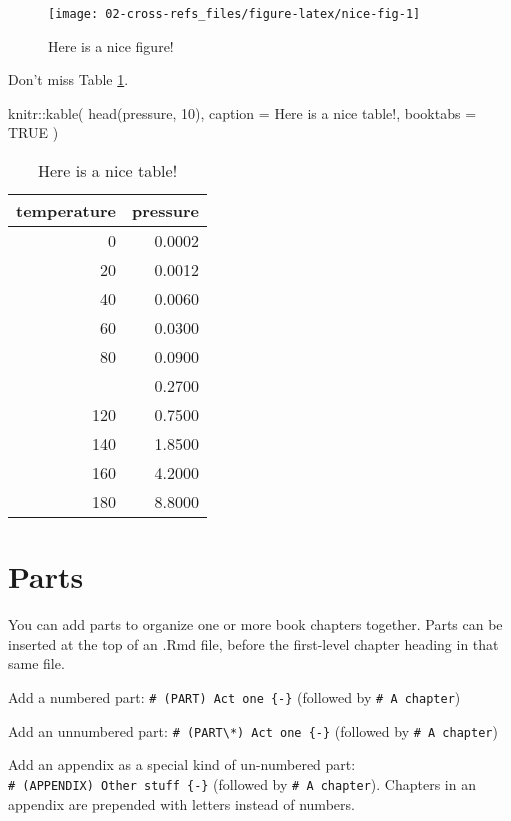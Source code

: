 \documentclass[
]{article}
\newenvironment{Shaded}{\begin{snugshade}}{\end{snugshade}}
\newcommand{\AttributeTok}[1]{\textcolor[rgb]{0.77,0.63,0.00}{#1}}
\newcommand{\ConstantTok}[1]{\textcolor[rgb]{0.00,0.00,0.00}{#1}}
\newcommand{\DecValTok}[1]{\textcolor[rgb]{0.00,0.00,0.81}{#1}}
\newcommand{\FunctionTok}[1]{\textcolor[rgb]{0.00,0.00,0.00}{#1}}
\newcommand{\NormalTok}[1]{#1}
\newcommand{\SpecialCharTok}[1]{\textcolor[rgb]{0.00,0.00,0.00}{#1}}
\newcommand{\StringTok}[1]{\textcolor[rgb]{0.31,0.60,0.02}{#1}}
\begin{document}
\begin{figure}

{\centering \texttt{[image: 02-cross-refs\_files/figure-latex/nice-fig-1]} 

}

\caption{Here is a nice figure!}\label{fig:nice-fig}
\end{figure}

Don't miss Table \ref{tab:nice-tab}.

\begin{Shaded}
\begin{Highlighting}[]
\NormalTok{knitr}\SpecialCharTok{::}\FunctionTok{kable}\NormalTok{(}
  \FunctionTok{head}\NormalTok{(pressure, }\DecValTok{10}\NormalTok{), }\AttributeTok{caption =} \StringTok{\textquotesingle{}Here is a nice table!\textquotesingle{}}\NormalTok{,}
  \AttributeTok{booktabs =} \ConstantTok{TRUE}
\NormalTok{)}
\end{Highlighting}
\end{Shaded}

\begin{table}

\caption{\label{tab:nice-tab}Here is a nice table!}
\centering
\begin{tabular}[t]{rr}
\toprule
temperature & pressure\\
\midrule
0 & 0.0002\\
20 & 0.0012\\
40 & 0.0060\\
60 & 0.0300\\
80 & 0.0900\\
\addlinespace
100 & 0.2700\\
120 & 0.7500\\
140 & 1.8500\\
160 & 4.2000\\
180 & 8.8000\\
\bottomrule
\end{tabular}
\end{table}

\hypertarget{parts}{%
\section{Parts}\label{parts}}

You can add parts to organize one or more book chapters together. Parts can be inserted at the top of an .Rmd file, before the first-level chapter heading in that same file.

Add a numbered part: \texttt{\#\ (PART)\ Act\ one\ \{-\}} (followed by \texttt{\#\ A\ chapter})

Add an unnumbered part: \texttt{\#\ (PART\textbackslash{}*)\ Act\ one\ \{-\}} (followed by \texttt{\#\ A\ chapter})

Add an appendix as a special kind of un-numbered part: \texttt{\#\ (APPENDIX)\ Other\ stuff\ \{-\}} (followed by \texttt{\#\ A\ chapter}). Chapters in an appendix are prepended with letters instead of numbers.
\end{document}
